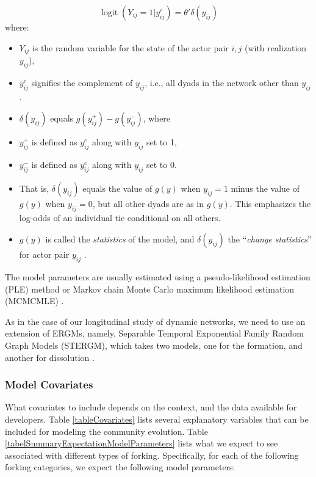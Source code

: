 \documentclass{acm_proc_article-sp}
\begin{document}
\begin{equation} \operatorname{logit}{(Y_{ij}=1|y^{c}_{ij})=\theta'\delta(y_{ij})} \end{equation}
where: 
\begin{itemize}
\item \( Y_{ij} \) is the random variable for the state of the actor pair \( i,j \) (with realization \( y_{ij} \)), 
\item \( y^{c}_{ij} \) signifies the complement of \( y_{ij} \), i.e., all dyads in the network other than \( y_{ij} \). 
\item \( \delta(y_{ij}) \) equals \( g(y^{+}_{ij})-g(y^{-}_{ij}) \), where 
\item \( y^{+}_{ij} \) is defined as \( y^{c}_{ij} \) along with \( y_{ij} \) set to 1,
\item \( y^{-}_{ij} \) is defined as \( y^{c}_{ij} \) along with \( y_{ij} \) set to 0.
\item That is, \( \delta(y_{ij}) \) equals the value of \( g(y) \) when \( y_{ij}=1 \) minus the value of \( g(y) \) when \( y_{ij}=0 \), but all other dyads are as in \( g(y) \). This emphasizes the log-odds of an individual tie conditional on all others. 
\item \( g(y) \) is called the \textit{statistics} of the model, and \(\delta(y_{ij}) \) the ``\textit{change statistics}'' for actor pair \( y_{ij} \) \cite{Krivitsky}.
\end{itemize}

The model parameters are usually estimated using a pseudo-likelihood estimation (PLE) method or Markov chain Monte Carlo maximum likelihood estimation (MCMCMLE) \cite{SnijdersMCMCMLE}. 

As in the case of our longitudinal study of dynamic networks, we need to use an extension of ERGMs, namely, Separable Temporal Exponential Family Random Graph Models (STERGM), which takes two models, one for the formation, and another for dissolution \cite{Krivitsky}.

\subsubsection{Model Covariates}
What covariates to include depends on the context, and the data available for developers.
Table \ref{tableCovariates} lists several explanatory variables that can be included for modeling the community evolution. Table \ref{tabelSummaryExpectationModelParameters} lists what we expect to see associated with different types of forking. Specifically, for each of the following forking categories, we expect the following model parameters:
\end{document}

